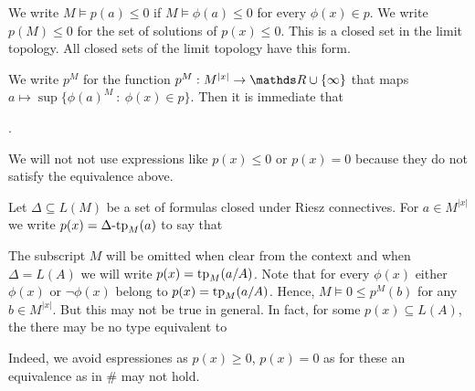 \documentclass[creche.tex]{subfiles}
\begin{document}

We write \emph{$M\models p(a)\le0$} if $M\models\phi(a)\le0$ for every $\phi(x)\in p$. We write $p(M)\le0$ for the set of solutions of $p(x)\le0$. This is a closed set in the limit topology. All closed sets of the limit topology have this form. 


We write $p^M$ for the function $p^M:M^{|x|}\to\RR\cup\{\infty\}$ that maps $a\mapsto\sup\big\{\phi(a)^M\ :\ \phi(x)\in p\big\}$. Then it is immediate that

.

We will not not use expressions like \emph{$p(x)\le0$} or \emph{$p(x)=0$} because they do not satisfy the equivalence above.



Let $\Delta\subseteq L(M)$ be a set of formulas closed under Riesz connectives. For $a\in M^{|x|}$ we write \emph{$p(x)=\Delta\mbox{\rm -tp}_M(a)$\/} to say that 


The subscript $M$ will be omitted when clear from the context and when $\Delta=L(A)$ we will write \emph{$p(x)={\rm tp}_M(a/A)$}.  Note that for every $\phi(x)$ either $\phi(x)$ or $\neg\phi(x)$ belong to $p(x)={\rm tp}_M(a/A)$. Hence, $M\models 0\le p^M(b)$ for any $b\in M^{|x|}$. But this may not be true in general. In fact, for some $p(x)\subseteq L(A)$, the there may be no type equivalent to 


Indeed, we avoid espressiones as $p(x)\ge0$, $p(x)=0$ as for these an equivalence as in $\#$ may not hold.
\end{document}
